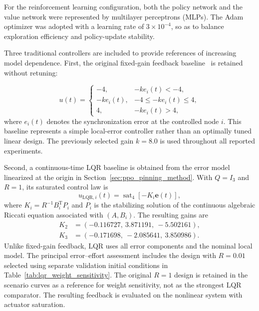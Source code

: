 \documentclass[a4paper,fleqn]{cas-dc}
\theoremstyle{plain}
\theoremstyle{definition}
\begin{document}
For the reinforcement learning configuration, both the policy network and the value network were represented by multilayer perceptrons (MLPs). The Adam optimizer was adopted with a learning rate of $3\times 10^{-4}$, so as to balance exploration efficiency and policy-update stability.

Three traditional controllers are included to provide references of increasing model dependence. First, the original fixed-gain feedback baseline~\cite{yassen2005controlling} is retained without retuning:

\begin{equation}
	u(t)=
	\begin{cases}
		-4, & -k e_i(t)<-4,\\
		-k e_i(t), & -4\leq -k e_i(t)\leq 4,\\
		4, & -k e_i(t)>4,
	\end{cases}
	\label{eq:linear_feedback_baseline}
\end{equation}
where $e_i(t)$ denotes the synchronization error at the controlled node $i$. This baseline represents a simple local-error controller rather than an optimally tuned linear design. The previously selected gain $k=8.0$ is used throughout all reported experiments.

Second, a continuous-time LQR baseline is obtained from the error model linearized at the origin in Section~\ref{sec:ppo_pinning_method}. With $Q=I_3$ and $R=1$, its saturated control law is
\begin{equation}
	u_{\mathrm{LQR},i}(t)=\operatorname{sat}_{4}\!\left[-K_i\mathbf e(t)\right],
	\label{eq:lqr_baseline}
\end{equation}
where $K_i=R^{-1}B_i^{\mathrm T}P_i$ and $P_i$ is the stabilizing solution of the continuous algebraic Riccati equation associated with $(A,B_i)$. The resulting gains are
\[
\begin{aligned}
K_2&=(-0.116727,\ 3.871191,\ -5.502161),\\
K_3&=(-0.171698,\ -2.085641,\ 3.850986).
\end{aligned}
\]
Unlike fixed-gain feedback, LQR uses all error components and the nominal local model. The principal error--effort assessment includes the design with $R=0.01$ selected using separate validation initial conditions in Table~\ref{tab:lqr_weight_sensitivity}. The original $R=1$ design is retained in the scenario curves as a reference for weight sensitivity, not as the strongest LQR comparator. The resulting feedback is evaluated on the nonlinear system with actuator saturation.
\end{document}
